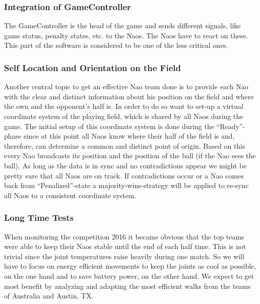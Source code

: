 \documentclass[12pt]{article}
\theoremstyle{definition}
\begin{document}
\subsubsection{Integration of GameController}
The GameController is the head of the game and sends different signals, like game status, penalty states, etc. to the Naos. The Naos have to react on these. This part of the software is considered to be one of the less critical ones.

\subsubsection{Self Location and Orientation on the Field}
Another central topic to get an effective Nao team done is to provide each Nao with the clear and distinct information about his position on the field and where the own and the opponent's half is. In order to do so want to set-up a virtual coordinate system of the playing field, which is shared by all Naos during the game. The initial setup of this coordinate system is done during the “Ready”-phase since at this point all Naos know where their half of the field is and, therefore, can determine a common and distinct point of origin. Based on this every Nao broadcasts its position and the position of the ball (if the Nao sees the ball). As long as the data is in sync and no contradictions appear we might be pretty sure that all Naos are on track. If contradictions occur or a Nao comes back from “Penalized”-state a majority-wins-strategy will be applied to re-sync all Naos to a consistent coordinate system.


\subsubsection{Long Time Tests}
When monitoring the competition 2016 it became obvious that the top teams were able to keep their Naos stable until the end of each half time. This is not trivial since the joint temperatures raise heavily during one match. So we will have to focus on energy efficient movements to keep the joints as cool as possible, on the one hand and to save battery power, on the other hand. We expect to get most benefit by analyzing and adapting the most efficient walks from the teams of Australia and Austin, TX.
\end{document}
